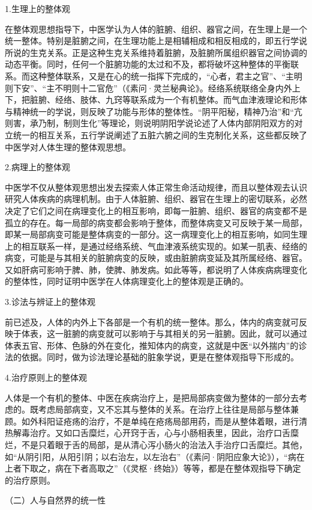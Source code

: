 \documentclass[a4paper,12pt,UTF8,twoside]{ctexbook}
\begin{document}
1.生理上的整体观

在整体观思想指导下，中医学认为人体的脏腑、组织、器官之间，在生理上是一个统一整体。特别是脏腑之间，在生理功能上是相辅相成和相反相成的，即五行学说所说的生克关系。正是这种生克关系维持着脏腑，及脏腑所属组织器官之间协调的动态平衡。同时，任何一个脏腑功能的太过和不及，都将破坏这种整体的平衡联系。而这种整体联系，又是在心的统一指挥下完成的，“心者，君主之官”、“主明则下安”、“主不明则十二官危”（《素问·灵兰秘典论》。经络系统联络全身内外上下，把脏腑、经络、肢体、九窍等联系成为一个有机整体。而气血津液理论和形体与精神统一的学说，则反映了功能与形体的整体性。“阴平阳秘，精神乃治”和“亢则害，承乃制，制则生化”等理论，则说明阴阳学说论述了人体内部阴阳双方的对立统一的相互关系，五行学说阐述了五脏六腑之间的生克制化关系，这些都反映了中医学对人体生理的整体观思想。

2.病理上的整体观

中医学不仅从整体观思想出发去探索人体正常生命活动规律，而且以整体观去认识研究人体疾病的病理机制。由于人体脏腑、组织、器官在生理上的密切联系，必然决定了它们之间在病理变化上的相互影响，即每一脏腑、组织、器官的病变都不是孤立的存在。每一局部的病变都会影响于整体，而整体病变又可反映于某一局部，即某一局部病变可能是整体病变的一部分。这一病理变化上的相互影响，如同生理上的相互联系一样，是通过经络系统、气血津液系统实现的。如某一肌表、经络的病变，可能是与其相关的脏腑病变的反映，或由脏腑病变延及其所属经络、器官。又如肝病可影响于脾、肺，使脾、肺发病。如此等等，都说明了人体疾病病理变化的整体性，同时证明中医学在人体病理变化上的整体观是正确的。

3.诊法与辨证上的整体观

前已述及，人体的内外上下各部是一个有机的统一整体。那么，体内的病变就可反映于体表，这一脏腑的病变就可以影响于与其相关的另一脏腑。因此，就可以通过体表五官、形体、色脉的外在变化，推知体内的病变，这就是中医“以外揣内”的诊法的依据。同时，做为诊法理论基础的脏象学说，更是在整体观指导下形成的。

4.治疗原则上的整体观

人体是一个有机的整体、中医在疾病治疗上，是把局部病变做为整体的一部分去考虑的。既考虑局部病变，又不忘其与整体的关系。在治疗上往往是局部与整体兼顾。如外科阳证疮疡的治疗，不是单纯在疮疡局部用药，而是从整体着眼，进行清热解毒治疗。又如口舌糜烂，心开窍于舌，心与小肠相表里，因此，治疗口舌糜烂，不是只着眼于舌的局部，是从清心泻小肠火的治法入手治疗口舌糜烂。其他，如“从阴引阳，从阳引阴；以右治左，以左治右”（《素问·阴阳应象大论》），“病在上者下取之，病在下者高取之”（《灵枢·终始》）等等，都是在整体观指导下确定的治疗原则。

（二）人与自然界的统一性
\end{document}
